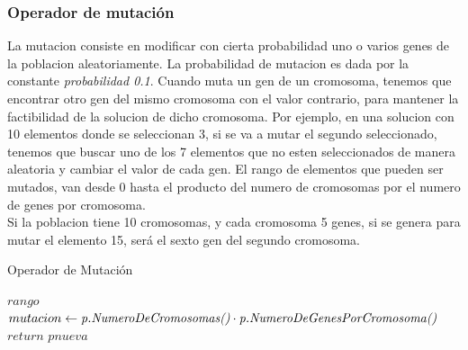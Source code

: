 \documentclass{article}
\begin{document}
\subsubsection{\small Operador de mutación}
La mutacion consiste en modificar con cierta probabilidad uno o varios genes de la poblacion 
aleatoriamente. La probabilidad de mutacion es dada por la constante \emph{probabilidad 0.1}.
Cuando muta un gen de un cromosoma, tenemos que encontrar otro gen del mismo cromosoma con el valor contrario,
para mantener la factibilidad de la solucion de dicho cromosoma.
Por ejemplo, en una solucion con 10 elementos donde se seleccionan 3, si se va a mutar el segundo seleccionado, tenemos que buscar uno de los 7
elementos que no esten seleccionados de manera aleatoria y cambiar el valor de cada gen.
El rango de elementos que pueden ser mutados, van desde 0 hasta el producto del numero de cromosomas por el numero de genes 
por cromosoma.\\
Si la poblacion tiene 10 cromosomas, y cada cromosoma 5 genes, si se genera para mutar el elemento 15, será el sexto gen del segundo cromosoma.

\begin{algorithm}[H]
  \scriptsize
  \label{Operador de Mutacion}
  \caption{Operador de Mutación}
\vspace{3mm}

$rango$ $mutacion \leftarrow \emph{p.NumeroDeCromosomas()} \cdot \emph{p.NumeroDeGenesPorCromosoma()} $\\

$return$ $pnueva$\\ 

\end{algorithm}
\end{document}
